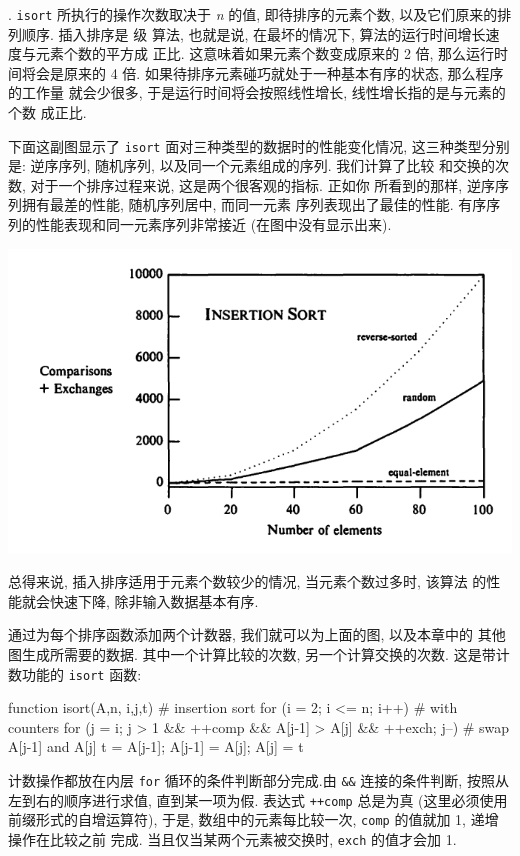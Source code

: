 . \texttt{isort} 所执行的操作次数取决于 \textit{n} 的值,
即待排序的元素个数, 以及它们原来的排列顺序. 插入排序是  级
算法, 也就是说, 在最坏的情况下, 算法的运行时间增长速度与元素个数的平方成
正比. 这意味着如果元素个数变成原来的 2 倍, 那么运行时间将会是原来的
4 倍. 如果待排序元素碰巧就处于一种基本有序的状态, 那么程序的工作量
就会少很多, 于是运行时间将会按照线性增长, 线性增长指的是与元素的个数
成正比.

下面这副图显示了 \texttt{isort} 面对三种类型的数据时的性能变化情况,
这三种类型分别是: 逆序序列, 随机序列, 以及同一个元素组成的序列.
我们计算了比较
和交换的次数, 对于一个排序过程来说, 这是两个很客观的指标. 正如你
所看到的那样, 逆序序列拥有最差的性能, 随机序列居中, 而同一元素
序列表现出了最佳的性能. 有序序列的性能表现和同一元素序列非常接近
(在图中没有显示出来).

\begin{center}
    \includegraphics[scale=0.7]{./images/insertion_sort.png}
\end{center}

总得来说, 插入排序适用于元素个数较少的情况, 当元素个数过多时, 该算法
的性能就会快速下降, 除非输入数据基本有序.

通过为每个排序函数添加两个计数器, 我们就可以为上面的图, 以及本章中的
其他图生成所需要的数据. 其中一个计算比较的次数, 另一个计算交换的次数.
这是带计数功能的 \texttt{isort} 函数:
\begin{awkcode}
    function isort(A,n,     i,j,t) {  # insertion sort
        for (i = 2; i <= n; i++)      # with counters
            for (j = i; j > 1 && ++comp &&
              A[j-1] > A[j] && ++exch; j--) {
                # swap A[j-1] and A[j]
                t = A[j-1]; A[j-1] = A[j]; A[j] = t
            }
    }
\end{awkcode}
计数操作都放在内层 \texttt{for} 循环的条件判断部分完成.由 \verb'&&'
连接的条件判断, 按照从左到右的顺序进行求值, 直到某一项为假. 表达式
\texttt{++comp} 总是为真 (这里必须使用前缀形式的自增运算符), 于是,
数组中的元素每比较一次, \texttt{comp} 的值就加 1, 递增操作在比较之前
完成. 当且仅当某两个元素被交换时, \texttt{exch} 的值才会加 1.

